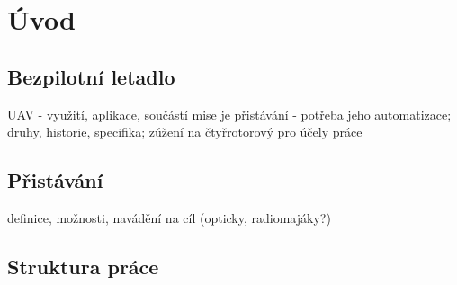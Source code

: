 \chapter{Úvod} \label{chap:introduction}




\section{Bezpilotní letadlo}
UAV - využití, aplikace, součástí mise je přistávání - potřeba jeho automatizace; druhy, historie, specifika; zúžení na čtyřrotorový pro účely práce
\section{Přistávání}
definice, možnosti, navádění na cíl (opticky, radiomajáky?)
\section{Struktura práce}